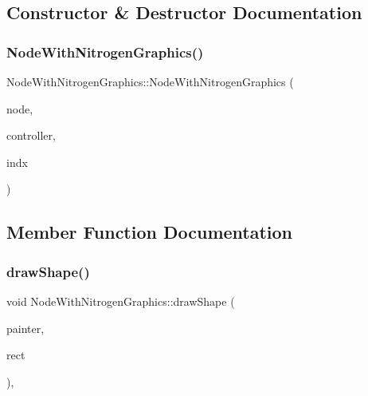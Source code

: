\subsection{Constructor \& Destructor Documentation}
\mbox{\label{class_node_with_nitrogen_graphics_a82d85b2b7a2b023b1e5b23fa6b6ce410}} 
\subsubsection{\texorpdfstring{NodeWithNitrogenGraphics()}{NodeWithNitrogenGraphics()}}
{\footnotesize\ttfamily Node\+With\+Nitrogen\+Graphics\+::\+Node\+With\+Nitrogen\+Graphics (\begin{DoxyParamCaption}\item[{\mbox{\hyperlink{class_node_data}{Node\+Data}} $\ast$}]{node,  }\item[{\mbox{\hyperlink{class_map_objects_controller}{Map\+Objects\+Controller}} $\ast$}]{controller,  }\item[{int}]{indx }\end{DoxyParamCaption})\hspace{0.3cm}{\ttfamily [inline]}}



\subsection{Member Function Documentation}
\mbox{\label{class_node_with_nitrogen_graphics_adbaf1a906e787106914cb107a5f52bcc}} 
\subsubsection{\texorpdfstring{drawShape()}{drawShape()}}
{\footnotesize\ttfamily void Node\+With\+Nitrogen\+Graphics\+::draw\+Shape (\begin{DoxyParamCaption}\item[{Q\+Painter \&}]{painter,  }\item[{const qmapcontrol\+::\+Rect\+World\+Px \&}]{rect }\end{DoxyParamCaption})\hspace{0.3cm}{\ttfamily [protected]}, {\ttfamily [virtual]}}



